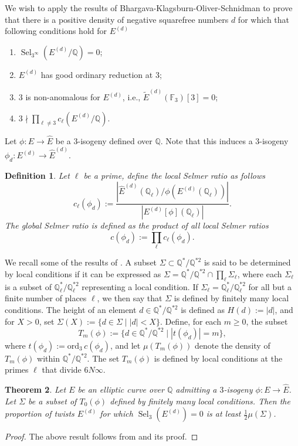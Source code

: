 \documentclass[12pt]{amsart}
\newtheorem{theorem}{Theorem}[section]
\newtheorem{definition}[theorem]{Definition}
\newcommand{\ord}{\mathrm{ord}}
\newcommand{\Q}{\mathbb{Q}}
\newcommand{\F}{\mathbb{F}}
\newcommand{\op}[1]{\operatorname{#1}}
\numberwithin{equation}{section}
\begin{document}
We wish to apply the results of Bhargava-Klagsburn-Oliver-Schnidman \cite{BKOS} to prove that there is a positive density of negative squarefree numbers $d$ for which that following conditions hold for $E^{(d)}$
\begin{enumerate}
    \item $\op{Sel}_{3^\infty}(E^{(d)}/\Q)=0$;
    \item $E^{(d)}$ has good ordinary reduction at $3$;
    \item $3$ is non-anomalous for $E^{(d)}$, i.e., $\widetilde{E}^{(d)}(\F_3)[3]=0$;
    \item $3\nmid \prod_{\ell\neq 3} c_\ell(E^{(d)}/\Q)$.
\end{enumerate}
\par Let $\phi: E\rightarrow \widehat{E}$ be a $3$-isogeny defined over $\Q$. Note that this induces a $3$-isogeny $\phi_d: E^{(d)}\rightarrow \widehat{E}^{(d)}$.
\begin{definition}Let $\ell$ be a prime, define the local Selmer ratio as follows
\[c_\ell(\phi_d):=\dfrac{\left|\widehat{E}^{(d)}(\Q_\ell)/\phi\left(E^{(d)}(\Q_\ell)\right)\right|}{|E^{(d)}[\phi](\Q_\ell)|}.\]
The \emph{global Selmer ratio} is defined as the product of all local Selmer ratios
\[c(\phi_d) := \prod_{\ell} c_\ell(\phi_d).\]
\end{definition}
We recall some of the results of \cite{BKOS}. A subset $\Sigma \subset \Q^*/\Q^{*2}$ is said to be determined by local conditions if it can be expressed as $\Sigma = \Q^*/\Q^{*2} \cap \prod_\ell \Sigma_\ell$, where each $\Sigma_\ell$ is a subset of $\Q_\ell^*/\Q_\ell^{*2}$ representing a local condition. If $\Sigma_\ell = \Q_\ell^*/\Q_\ell^{*2}$ for all but a finite number of places $\ell$, we then say that $\Sigma$ is defined by finitely many local conditions. The height of an element $d \in \Q^*/\Q^{*2}$ is defined as $H(d) := |d|$, and for $X>0$, set $\Sigma(X):=\{ d\in \Sigma \mid |d| < X \}$.
Define, for each $m \geq 0$, the subset  \[T_m(\phi) := \{d \in \Q^*/\Q^{*2} \mid |t(\phi_d)| = m \},\]
where $t(\phi_d) := \ord_3 \, c(\phi_d)$, and let $\mu(T_m(\phi))$ denote the density of $T_m(\phi)$ within $\Q^*/\Q^{*2}$. The set $T_m(\phi)$ is defined by local conditions at the primes $\ell$ that divide $6N\infty$.
   

\begin{theorem}\label{globalbounds}
Let $E$ be an elliptic curve over $\Q$ admitting a $3$-isogeny $\phi \colon E \to \widehat{E}$. Let $\Sigma$ be a subset of $T_0(\phi)$ defined by finitely many local conditions. Then the proportion of twists $E^{(d)}$ for which $\op{Sel}_3(E^{(d)})=0$ is at least $\frac{1}{2}\mu(\Sigma)$.
\end{theorem}
\begin{proof}
    The above result follows from \cite[Theorem 2.5]{BKOS} and its proof.
\end{proof}
\end{document}
